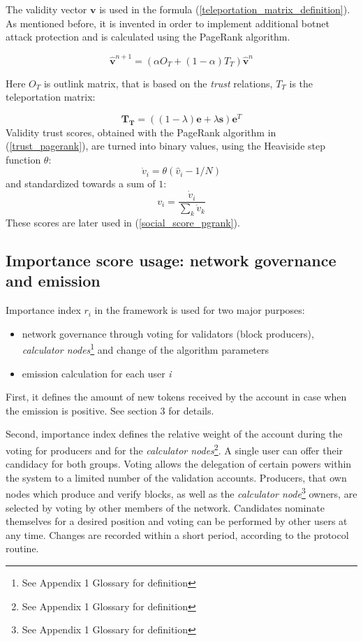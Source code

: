 \documentclass[a4paper,12pt]{article}
\begin{document}
The validity vector $\boldsymbol{v}$ is used in the formula (\ref{teleportation_matrix_definition}). As mentioned before, it is invented in order to implement additional botnet attack protection and is calculated using the PageRank algorithm.
	
	\begin{equation}
	\label{trust_pagerank}
	\boldsymbol{\hat{v}}^{n+1} = (\alpha O_T+(1-\alpha)T_T) \boldsymbol{\hat{v}}^{n}
	\end{equation}
	
	Here $O_T$ is outlink matrix, that is based on the \textit{trust} relations, $T_T$ is the teleportation matrix:
	
	$$
        \boldsymbol{T_T} = ((1 - \lambda) \boldsymbol{e} + \lambda \boldsymbol{s}) \boldsymbol{e}^T
	$$
	Validity trust scores, obtained with the PageRank algorithm in (\ref{trust_pagerank}), are turned into binary values, using the Heaviside step function $\theta$:
	$$
	\dot{v}_i = \theta({\hat{v}_i}-1/N)
	$$
and standardized towards a sum of $1$:
	$$
	v_i = \frac{\dot{v}_i}{\sum_k{\dot{v}_k}}
	$$
	These scores are later used in (\ref{social_score_pgrank}).
\subsection{Importance score usage: network governance and emission}

Importance index $r_i$ in the framework is used for two major purposes:
\begin{itemize}
\item  network governance through voting for validators (block producers), \emph{calculator nodes}\footnote{See Appendix 1 Glossary for definition} and change of the algorithm parameters
\item emission calculation for each user \textit{i}
\end{itemize}


First, it defines the amount of new tokens received by the account in case when the emission is positive.  See section 3 for details.

Second, importance index defines the relative weight of the account during the voting for producers and for the \emph{calculator nodes}\footnote{See Appendix 1 Glossary for definition}. A single user can offer their candidacy for both groups. Voting allows the delegation of certain powers within the system to a limited number of the validation accounts. Producers, that own nodes which produce and verify blocks, as well as the \emph{calculator node}\footnote{See Appendix 1 Glossary for definition} owners, are selected by voting by other members of the network. Candidates nominate themselves for a desired position and voting can be performed by other users at any time. Changes are recorded within a short period, according to the protocol routine.
\end{document}
